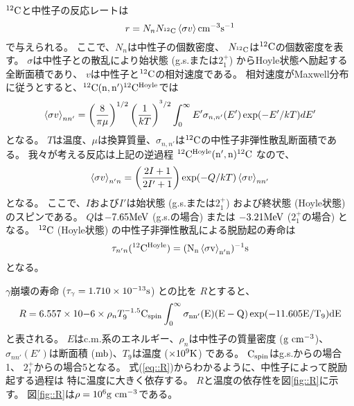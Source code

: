 ${}^{12}\rm{C}$と中性子の反応レートは
\begin{equation}
  r = N_{n}N_{{}^{12}\rm{C}}\braket{\sigma v} \rm{cm}^{-3}\rm{s}^{-1}
  \label{eq::r}
\end{equation}
で与えられる。
ここで、$N_{n}$は中性子の個数密度、
$N_{{}^{12}\rm{C}}$は${}^{12}\rm{C}$の個数密度を表す。
$\sigma$は中性子との散乱により始状態 (g.s.または$2_{1}^{+}$) からHoyle状態へ励起する全断面積であり、
$v$は中性子と${}^{12}\rm{C}$の相対速度である。
相対速度がMaxwell分布に従うとすると、${}^{12}\rm{C}(n,n'){}^{12}\rm{C}^{\rm{Hoyle}}$では
\begin{equation}
  \braket{\sigma v}_{nn'} =
  \left(\frac{8}{\pi\mu}\right)^{1/2}\left(\frac{1}{kT}\right)^{^3/2}
  \int^{\infty}_{0}E'\sigma_{n,n'}(E')\exp(-E'/kT)dE'
  \label{eq::sigmann'}
\end{equation}
となる。
$T$は温度、$\mu$は換算質量、$\sigma_{n,n'}$は${}^{12}\rm{C}$の中性子非弾性散乱断面積である。
我々が考える反応は上記の逆過程 ${}^{12}\rm{C}^{\rm{Hoyle}}(n',n){}^{12}\rm{C}$ なので、
\begin{equation}
  \braket{\sigma v}_{n'n} = \left(\frac{2I+1}{2I'+1}\right)
  \exp(-Q/kT)\braket{\sigma v}_{nn'}
  \label{eq::sigman'n}
\end{equation}
となる。
ここで、$I$および$I'$は始状態 (g.s.または$2_{1}^{+}$)
および終状態 (Hoyle状態) のスピンである。
$Q$は$-7.65\rm{MeV}$ (g.s.の場合) または
$-3.21\rm{MeV}$ ($2_{1}^{+}$の場合) となる。
${}^{12}\rm{C}$ (Hoyle状態) の中性子非弾性散乱による脱励起の寿命は
\begin{equation}
  \tau_{n'n}({}^{12}\rm{C}^{\rm{Hoyle}}) =
  (N_{n}\braket{\sigma v}_{n'n})^{-1} \rm{s}
  \label{eq::tau}
\end{equation}
となる。

$\gamma$崩壊の寿命 ($\tau_{\gamma} = 1.710\times10^{-13} \rm{s}$) との比を
$R$とすると、
\begin{equation}
  R = 6.557\times10{-6}\times\rho_{n}T_{9}^{-1.5}\rm{C}_{\rm{spin}}
  \int^{\infty}_{0}\sigma_{nn'}(E)(E-Q)\exp(-11.605E/T_{9})dE
  \label{eq::R}
\end{equation}
と表される。
$E$はc.m.系のエネルギー、$\rho_{n}$は中性子の質量密度 ($\rm{g}~\rm{cm}^{-3}$)、
$\sigma_{nn'}(E')$は断面積 ($\rm{mb}$)、$T_{9}$は温度 ($\times10^{9} \rm{K}$) である。
$\rm{C}_{\rm{spin}}$はg.s.からの場合1、
$2_{1}^{+}$からの場合5となる。
式(\ref{eq::R})からわかるように、中性子によって脱励起する過程は
特に温度に大きく依存する。
$R$と温度の依存性を図\ref{fig::R}に示す。
図\ref{fig::R}は$\rho = 10^{6}\rm{g}~\rm{cm}^{-3}$である。

